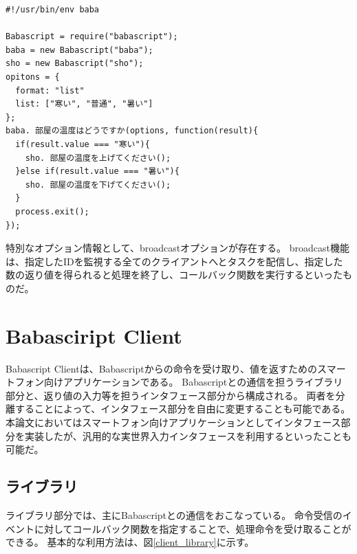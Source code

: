 \documentclass[twoside]{wiss}
\begin{document}
\begin{lstlisting}[caption=オプション情報例(Boolean), label=script_02]
#!/usr/bin/env baba

Babascript = require("babascript");
baba = new Babascript("baba");
sho = new Babascript("sho");
opitons = {
  format: "list"
  list: ["寒い", "普通", "暑い"]
};
baba. 部屋の温度はどうですか(options, function(result){
  if(result.value === "寒い"){
    sho. 部屋の温度を上げてください();
  }else if(result.value === "暑い"){
    sho. 部屋の温度を下げてください();
  }
  process.exit();
});

\end{lstlisting}

特別なオプション情報として、broadcastオプションが存在する。
broadcast機能は、指定したIDを監視する全てのクライアントへとタスクを配信し、指定した数の返り値を得られると処理を終了し、コールバック関数を実行するといったものだ。

\section{Babasciript Client}

Babascript Clientは、Babascriptからの命令を受け取り、値を返すためのスマートフォン向けアプリケーションである。
Babascriptとの通信を担うライブラリ部分と、返り値の入力等を担うインタフェース部分から構成される。
両者を分離することによって、インタフェース部分を自由に変更することも可能である。
本論文においてはスマートフォン向けアプリケーションとしてインタフェース部分を実装したが、汎用的な実世界入力インタフェースを利用するといったことも可能だ。


\subsection{ライブラリ}
ライブラリ部分では、主にBabascriptとの通信をおこなっている。
命令受信のイベントに対してコールバック関数を指定することで、処理命令を受け取ることができる。
基本的な利用方法は、図\ref{client_library}に示す。
\end{document}
